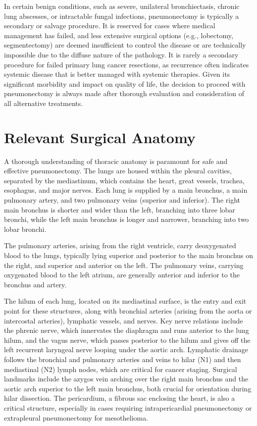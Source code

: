 In certain benign conditions, such as severe, unilateral bronchiectasis, chronic lung abscesses, or intractable fungal infections, pneumonectomy is typically a secondary or salvage procedure. It is reserved for cases where medical management has failed, and less extensive surgical options (e.g., lobectomy, segmentectomy) are deemed insufficient to control the disease or are technically impossible due to the diffuse nature of the pathology. It is rarely a secondary procedure for failed primary lung cancer resections, as recurrence often indicates systemic disease that is better managed with systemic therapies. Given its significant morbidity and impact on quality of life, the decision to proceed with pneumonectomy is always made after thorough evaluation and consideration of all alternative treatments.

\section*{Relevant Surgical Anatomy}
A thorough understanding of thoracic anatomy is paramount for safe and effective pneumonectomy. The lungs are housed within the pleural cavities, separated by the mediastinum, which contains the heart, great vessels, trachea, esophagus, and major nerves. Each lung is supplied by a main bronchus, a main pulmonary artery, and two pulmonary veins (superior and inferior). The right main bronchus is shorter and wider than the left, branching into three lobar bronchi, while the left main bronchus is longer and narrower, branching into two lobar bronchi. 

The pulmonary arteries, arising from the right ventricle, carry deoxygenated blood to the lungs, typically lying superior and posterior to the main bronchus on the right, and superior and anterior on the left. The pulmonary veins, carrying oxygenated blood to the left atrium, are generally anterior and inferior to the bronchus and artery. 

The hilum of each lung, located on its mediastinal surface, is the entry and exit point for these structures, along with bronchial arteries (arising from the aorta or intercostal arteries), lymphatic vessels, and nerves. Key nerve relations include the phrenic nerve, which innervates the diaphragm and runs anterior to the lung hilum, and the vagus nerve, which passes posterior to the hilum and gives off the left recurrent laryngeal nerve looping under the aortic arch. Lymphatic drainage follows the bronchial and pulmonary arteries and veins to hilar (N1) and then mediastinal (N2) lymph nodes, which are critical for cancer staging. Surgical landmarks include the azygos vein arching over the right main bronchus and the aortic arch superior to the left main bronchus, both crucial for orientation during hilar dissection. The pericardium, a fibrous sac enclosing the heart, is also a critical structure, especially in cases requiring intrapericardial pneumonectomy or extrapleural pneumonectomy for mesothelioma.

